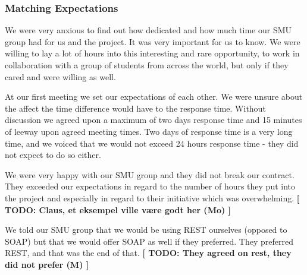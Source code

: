 \subsubsection{Matching Expectations}
We were very anxious to find out how dedicated and how much time our SMU group had for us and the project. It was very important for us to know. We were willing to lay a lot of hours into this interesting and rare opportunity, to work in collaboration with a group of students from across the world, but only if they cared and were willing as well.

At our first meeting we set our expectations of each other. We were unsure about the affect the time difference would have to the response time. Without discussion we agreed upon a maximum of two days response time and 15 minutes of leeway upon agreed meeting times. Two days of response time is a very long time, and we voiced that we would not exceed 24 hours response time - they did not expect to do so either.

We were very happy with our SMU group and they did not break our contract. They exceeded our expectations in regard to the number of hours they put into the project and especially in regard to their initiative which was overwhelming. \textbf{[ TODO: Claus, et eksempel ville være godt her (Mo) ]}

We told our SMU group that we would be using REST ourselves (opposed to SOAP) but that we would offer SOAP as well if they preferred. They preferred REST, and that was the end of that. \textbf{[ TODO: They agreed on rest, they did not prefer (M) ]}